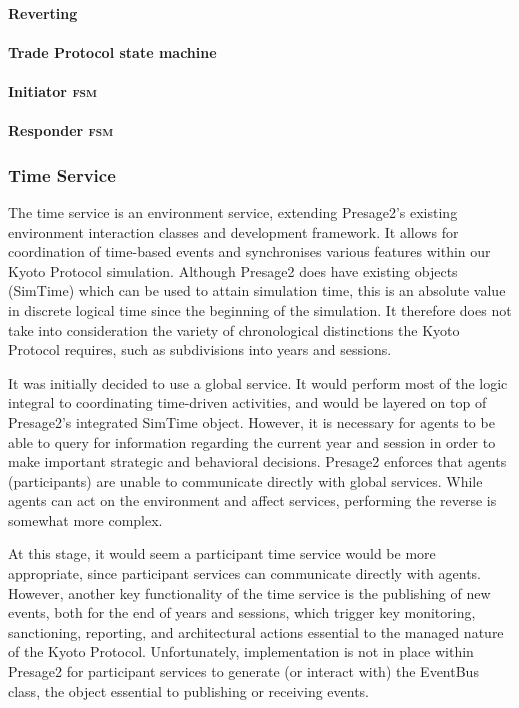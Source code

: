 \documentclass[]{article} %
\begin{document}
\paragraph{Reverting}

\paragraph{Trade Protocol state machine}

\paragraph{Initiator \textsc{fsm}}

\paragraph{Responder \textsc{fsm}}

\subsubsection{Time Service}

The time service is an environment service, extending Presage2’s existing environment interaction classes and development framework. It allows for coordination of time-based events and synchronises various features within our Kyoto Protocol simulation. Although Presage2 does have existing objects (SimTime) which can be used to attain simulation time, this is an absolute value in discrete logical time since the beginning of the simulation. It therefore does not take into consideration the variety of chronological distinctions the Kyoto Protocol requires, such as subdivisions into years and sessions.

It was initially decided to use a global service. It would perform most of the logic integral to coordinating time-driven activities, and would be layered on top of Presage2’s integrated SimTime object. However, it is necessary for agents to be able to query for information regarding the current year and session in order to make important strategic and behavioral decisions. Presage2 enforces that agents (participants) are unable to communicate directly with global services. While agents can act on the environment and affect services, performing the reverse is somewhat more complex.

At this stage, it would seem a participant time service would be more appropriate, since participant services can communicate directly with agents. However, another key functionality of the time service is the publishing of new events, both for the end of years and sessions, which trigger key monitoring, sanctioning, reporting, and architectural actions essential to the managed nature of the Kyoto Protocol. Unfortunately, implementation is not in place within Presage2 for participant services to generate (or interact with) the EventBus class, the object essential to publishing or receiving events.
\end{document}

